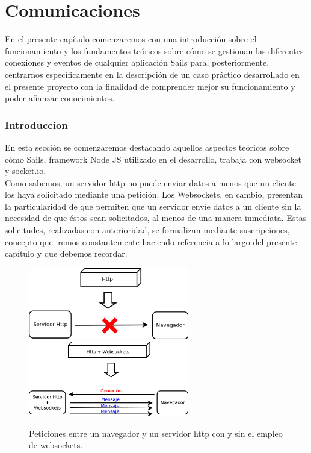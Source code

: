 \chapter{Comunicaciones}
\label{chap:robot}


En el presente capítulo comenzaremos con una introducción sobre el funcionamiento y los fundamentos teóricos sobre cómo se gestionan las diferentes conexiones y eventos de cualquier aplicación
Sails para, posteriormente, centrarnos específicamente en la descripción de un caso práctico desarrollado en el presente proyecto con la finalidad de comprender mejor su funcionamiento y poder afianzar
conocimientos.


\subsection{Introduccion}
\label{sec:fundamentos}

En esta sección se comenzaremos destacando aquellos aspectos teóricos sobre cómo Sails, framework Node JS utilizado en el desarrollo, trabaja con websocket y socket.io.\\

Como sabemos, un servidor http no puede enviar datos a menos que un cliente los haya solicitado mediante una petición. Los Websockets, en cambio, presentan la particularidad de que
permiten que un servidor envíe datos a un cliente sin la necesidad de que éstos sean solicitados, al menos de una manera inmediata. Estas solicitudes, realizadas con anterioridad, se formalizan mediante suscripciones, concepto que 
iremos constantemente haciendo referencia a lo largo del presente capítulo y que debemos recordar.\\


\begin{figure}%
    \centering
    \includegraphics[width=7cm]{diagramas/http-weboscket.png}
    \qquad
    \includegraphics[width=7cm]{diagramas/http+weboscket.png}
    \caption{Peticiones entre un navegador y un servidor http con y sin el empleo de websockets.}%
    \label{fig:http-request}%
\end{figure}

